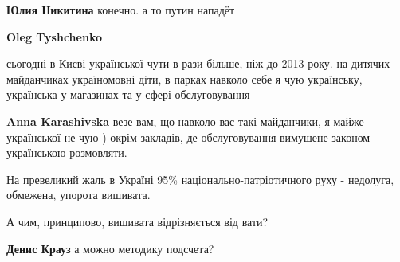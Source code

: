 \begin{itemize}
\begin{itemize}
 
\textbf{Юлия Никитина} конечно. а то путин нападёт

 
\textbf{Oleg Tyshchenko} 

сьогодні в Києві української чути в рази більше, ніж до 2013 року. на дитячих
майданчиках україномовні діти, в парках навколо себе я чую українську,
українська у магазинах та у сфері обслуговування


 
\textbf{Anna Karashivska} везе вам, що навколо вас такі майданчики, я майже української не чую ) окрім закладів, де обслуговування вимушене законом українською розмовляти.
\end{itemize}

 

На превеликий жаль в Україні 95\% національно-патріотичного руху - недолуга,
обмежена, упорота вишивата.

А чим, принципово, вишивата відрізняється від вати?

\begin{itemize}
 

\textbf{Денис Крауз} а можно методику подсчета? \Smiley[1.0][yellow]

 

\end{itemize}
\end{itemize}
